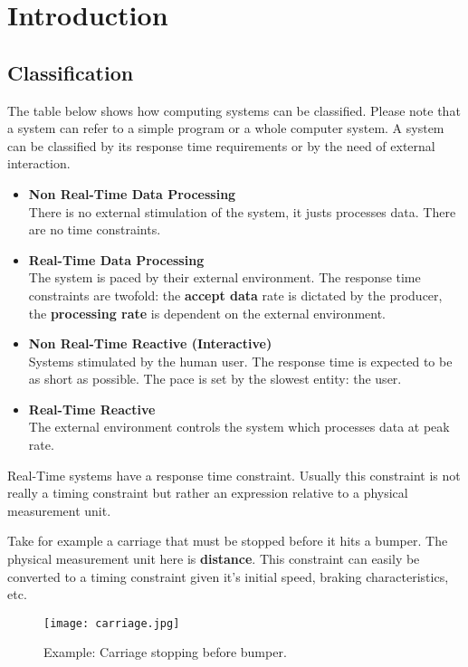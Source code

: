 \documentclass[../main.tex]{subfiles}
\begin{document}
\chapter{Introduction}

\section{Classification}

The table below shows how computing systems can be classified. Please note that a system can refer to a simple program or a whole computer system. A system can be classified by its response time requirements or by the need of external interaction. 

\begin{itemize}
	\item \textbf{Non Real-Time Data Processing} \\
	There is no external stimulation of the system, it justs processes data. There are no time constraints.
	\item \textbf{Real-Time Data Processing} \\
	The system is paced by their external environment. The response time constraints are twofold: the \textbf{accept data} rate is dictated by the producer, the \textbf{processing rate} is dependent on the external environment.
	\item \textbf{Non Real-Time Reactive (Interactive)} \\
	Systems stimulated by the human user. The response time is expected to be as short as possible. The pace is set by the slowest entity: the user.
	\item \textbf{Real-Time Reactive} \\
	The external environment controls the system which processes data at peak rate.
\end{itemize}

Real-Time systems have a response time constraint. Usually this constraint is not really a timing constraint but rather an expression relative to a physical measurement unit.

\begin{exmp}
Take for example a carriage that must be stopped before it hits a bumper. The physical measurement unit here is \textbf{distance}. This constraint can easily be converted to a timing constraint given it's initial speed, braking characteristics, etc. 
\begin{figure}[H]
    \centering
    \texttt{[image: carriage.jpg]}
    \caption{Example: Carriage stopping before bumper.}
    \label{carriage}
\end{figure}
\end{exmp}
\end{document}
